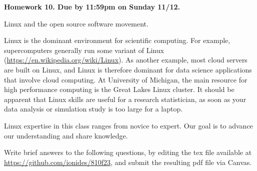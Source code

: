 \documentclass[12pt]{article}
\begin{document}
\begin{center}\bf
Homework 10. Due by 11:59pm on Sunday 11/12.

Linux and the open source software movement.

\end{center}

Linux is the dominant environment for scientific computing. For example, supercomputers generally run some variant of Linux (\url{https://en.wikipedia.org/wiki/Linux}). As another example, most cloud servers are built on Linux, and Linux is therefore dominant for data science applications that involve cloud computing. At University of Michigan, the main resource for high performance computing is the Great Lakes Linux cluster. It should be apparent that Linux skills are useful for a research statistician, as soon as your data analysis or simulation study is too large for a laptop.

Linux expertise in this class ranges from novice to expert. Our goal is to advance our understanding and share knowledge.

Write brief answers to the following questions, by editing the tex file available at \url{https://github.com/ionides/810f23}, and submit the resulting pdf file via Canvas.
\end{document}
